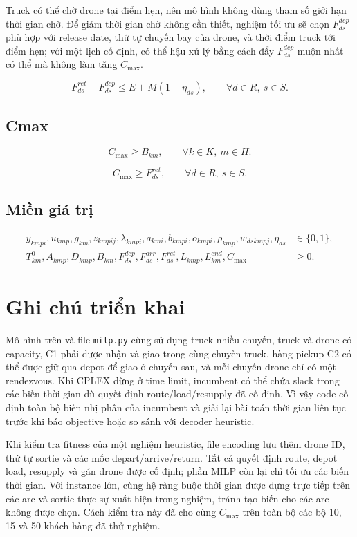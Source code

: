\documentclass[12pt,a4paper]{article}
\begin{document}
Truck có thể chờ drone tại điểm hẹn, nên mô hình không dùng tham số giới hạn thời
gian chờ. Để giảm thời gian chờ không cần thiết, nghiệm tối ưu sẽ chọn
\(F^{dep}_{ds}\) phù hợp với release date, thứ tự chuyến bay của drone, và thời điểm
truck tới điểm hẹn; với một lịch cố định, có thể hậu xử lý bằng cách đẩy
\(F^{dep}_{ds}\) muộn nhất có thể mà không làm tăng \(C_{\max}\).

\begin{equation}
  F^{ret}_{ds}-F^{dep}_{ds}\le E+M(1-\eta_{ds}),
  \qquad \forall d\in R,\ s\in S.
\end{equation}

\subsection{Cmax}

\begin{equation}
  C_{\max}\ge B_{km},
  \qquad \forall k\in K,\ m\in H.
\end{equation}

\begin{equation}
  C_{\max}\ge F^{ret}_{ds},
  \qquad \forall d\in R,\ s\in S.
\end{equation}

\subsection{Miền giá trị}

\begin{align*}
y_{kmpi},u_{kmp},g_{km},z_{kmpij},\lambda_{kmpi},
a_{kmi},b_{kmpi},o_{kmpi},\rho_{kmp},w_{dskmpj},\eta_{ds}
&\in\{0,1\},\\
T^0_{km},A_{kmp},D_{kmp},B_{km},
F^{dep}_{ds},F^{arr}_{ds},F^{ret}_{ds},L_{kmp},L^{end}_{km},C_{\max}
&\ge0.
\end{align*}

\section{Ghi chú triển khai}

Mô hình trên và file \texttt{milp.py} cùng sử dụng truck nhiều chuyến, truck và drone
có capacity, C1 phải được nhận và giao trong cùng chuyến truck, hàng pickup C2 có thể
được giữ qua depot để giao ở chuyến sau, và mỗi chuyến drone chỉ có một rendezvous.
Khi CPLEX dừng ở time limit, incumbent có thể chứa slack trong các biến thời gian dù
quyết định route/load/resupply đã cố định. Vì vậy code cố định toàn bộ biến nhị phân
của incumbent và giải lại bài toán thời gian liên tục trước khi báo objective hoặc so
sánh với decoder heuristic.

Khi kiểm tra fitness của một nghiệm heuristic, file encoding lưu thêm drone ID, thứ
tự sortie và các mốc depart/arrive/return. Tất cả quyết định route, depot load,
resupply và gán drone được cố định; phần MILP còn lại chỉ tối ưu các biến thời gian.
Với instance lớn, cùng hệ ràng buộc thời gian được dựng trực tiếp trên các arc và
sortie thực sự xuất hiện trong nghiệm, tránh tạo biến cho các arc không được chọn.
Cách kiểm tra này đã cho cùng $C_{\max}$ trên toàn bộ các bộ 10, 15 và 50 khách
hàng đã thử nghiệm.
\end{document}
